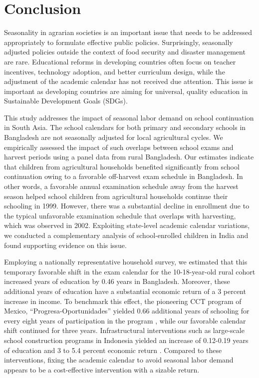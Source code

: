 \documentclass[12pt,letterpaper]{article}
\newcommand{\0}{\ensuremath{\mbox{\boldmath $0$}}}
\begin{document}
\section{Conclusion}

Seasonality in agrarian societies is an important issue that needs to be addressed appropriately to formulate effective public policies. Surprisingly, seasonally adjusted policies outside the context of food security and disaster management are rare. Educational reforms in developing countries often focus on teacher incentives, technology adoption, and better curriculum design, while the adjustment of the academic calendar has not received due attention. This issue is important as developing countries are aiming for universal, quality education in Sustainable Development Goals (SDGs).

This study addresses the impact of seasonal labor demand on school continuation in South Asia. The school calendars for both primary and secondary schools in Bangladesh are not seasonally adjusted for local agricultural cycles. We empirically assessed the impact of such overlaps between school exams and harvest periods using a panel data from rural Bangladesh. Our estimates indicate that children from agricultural households benefited significantly from school continuation owing to a favorable off-harvest exam schedule in Bangladesh. In other words, a favorable annual examination schedule away from the harvest season helped school children from agricultural households continue their schooling in 1999. However, there was a substantial decline in enrollment due to the typical unfavorable examination schedule that overlaps with harvesting, which was observed in 2002. Exploiting state-level academic calendar variations, we conducted a complementary analysis of school-enrolled children in India and found supporting evidence on this issue.

Employing a nationally representative household survey, we estimated that this temporary favorable shift in the exam calendar for the 10-18-year-old rural cohort increased years of education by 0.46 years in Bangladesh. Moreover, these additional years of education have a substantial economic return of a 3 percent increase in income. To benchmark this effect, the pioneering CCT program of Mexico, ``Progresa-Oportunidades'' yielded 0.66 additional years of schooling for every eight years of participation in the program \citep{reimers2006education}, while our favorable calendar shift continued for three years. Infrastructural interventions such as large-scale school construction programs in Indonesia yielded an increase of 0.12-0.19 years of education and 3 to 5.4 percent economic return \citep{duflo2001schooling}. Compared to these interventions, fixing the academic calendar to avoid seasonal labor demand appears to be a cost-effective intervention with a sizable return.
\end{document}
